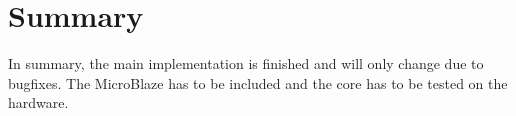 \section{Summary}
In summary, the main implementation is finished and will only change due to bugfixes. The MicroBlaze has to be included and the core has to be tested on the hardware. 
